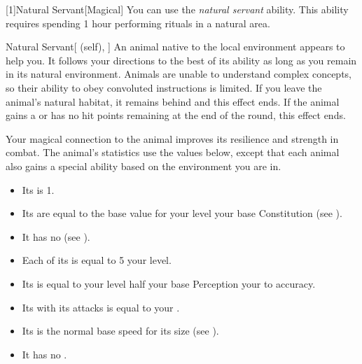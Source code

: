         [1]{Natural Servant}[Magical]
        You can use the \textit{natural servant} ability.
        This ability requires spending 1 hour performing rituals in a natural area.
        \begin{attuneability}{Natural Servant}[ (self), ]
            An animal native to the local environment appears to help you.
            It follows your directions to the best of its ability as long as you remain in its natural environment.
            Animals are unable to understand complex concepts, so their ability to obey convoluted instructions is limited.
            If you leave the animal's natural habitat, it remains behind and this effect ends.
            If the animal gains a  or has no hit points remaining at the end of the round, this effect ends.

            Your magical connection to the animal improves its resilience and strength in combat.
            The animal's statistics use the values below, except that each animal also gains a special ability based on the environment you are in.
            \begin{itemize}
                \item Its  is 1.
                \item Its  are equal to the base value for your level \add your base Constitution (see ).
                \item It has no  (see ).
                \item Each of its  is equal to 5 \add your level.
                \item Its  is equal to your level \add half your base Perception \add your  to accuracy.
                \item Its  with its attacks is equal to your  .
                \item Its  is the normal base speed for its size (see ).
                \item It has no .
            \end{itemize}
        \end{attuneability}

